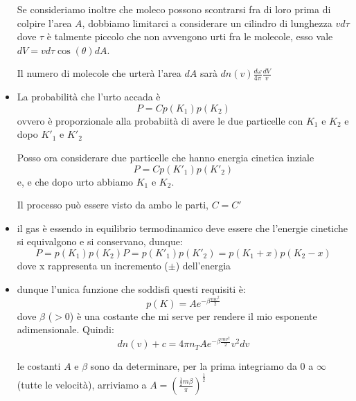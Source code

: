 \documentclass{article}
\begin{document}
\begin{itemize}
\begin{nota}
    Se consideriamo inoltre che moleco possono scontrarsi fra di loro prima di colpire l'area $A$, dobbiamo limitarci a considerare un cilindro di lunghezza $vd\tau$
    dove $\tau$ è talmente piccolo che non avvengono urti fra le molecole, esso vale $dV=v d\tau \cos(\theta)dA$. 
    
    Il numero di molecole che urterà l'area $dA$ sarà $dn(v)\frac{d\omega}{4\pi}\frac{dV}{v}$
\end{nota}







































    \item La probabilità che l'urto accada è \[P=Cp(K_1)p(K_2)\] ovvero è proporzionale alla probabiità di avere le due particelle con $K_1$ e $K_2$ e dopo $K'_1$ e $K'_2$
    
    Posso ora considerare due particelle che hanno energia cinetica inziale \[P=Cp(K'_1)p(K'_2)\]e, e che dopo urto abbiamo $K_1$ e $K_2$.

    Il processo può essere visto da ambo le parti, $C=C'$
    \item il gas è essendo in equilibrio termodinamico deve essere che l'energie cinetiche si equivalgono e si conservano, dunque:
    \[P=p(K_1)p(K_2)P=p(K'_1)p(K'_2)=p(K_1+x)p(K_2-x)\]
    dove x rappresenta un incremento ($\pm$) dell'energia
    
    \item dunque l'unica funzione che soddisfi questi requisiti è:
    \[
    p(K)=A e^{-\beta \frac{mv^2}{2}}
    \]
dove $\beta$ ($>0$) è una costante che mi serve per rendere il mio esponente adimensionale.
Quindi:
\[ dn(v)+c=4 \pi n_T A e^{-\beta \frac{mv^2}{2}} v^2 dv\] 

\begin{nota}

le costanti $A$ e $\beta$ sono da determinare, per la prima integriamo da 0 a $\infty$ (tutte le velocità), arriviamo a $A=\left( \frac{\frac{1}{2}m\beta}{\pi}\right)^\frac{1}{2}$


\end{nota}
\end{itemize}
\end{document}
